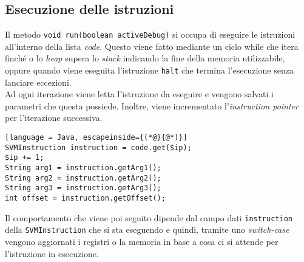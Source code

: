 \documentclass[../report.tex]{subfiles}
\begin{document}
\subsection{Esecuzione delle istruzioni}\label{ss:esecuzione-istruzioni}
Il metodo \verb|void run(boolean activeDebug)| si occupa di eseguire le istruzioni all'interno della lista \textit{code}. Questo viene fatto mediante un ciclo while che itera finché o lo \textit{heap} supera lo \textit{stack} indicando la fine della memoria utilizzabile, oppure quando viene eseguita l'istruzione \verb|halt| che termina l'esecuzione senza lanciare eccezioni.\\
Ad ogni iterazione viene letta l'istruzione da eseguire e vengono salvati i parametri che questa possiede.
Inoltre, viene incrementato l'\textit{instruction pointer} per l'iterazione successiva.
\begin{lstlisting}[language = Java, escapeinside={(*@}{@*)}]
SVMInstruction instruction = code.get($ip);
$ip += 1;
String arg1 = instruction.getArg1();
String arg2 = instruction.getArg2();
String arg3 = instruction.getArg3();
int offset = instruction.getOffset();
\end{lstlisting}
Il comportamento che viene poi seguito dipende dal campo dati \verb|instruction| della \verb|SVMInstruction| che si sta eseguendo e quindi, tramite uno \textit{switch-case} vengono aggiornati i registri o la memoria in base a cosa ci si attende per l'istruzione in esecuzione.
\end{document}
